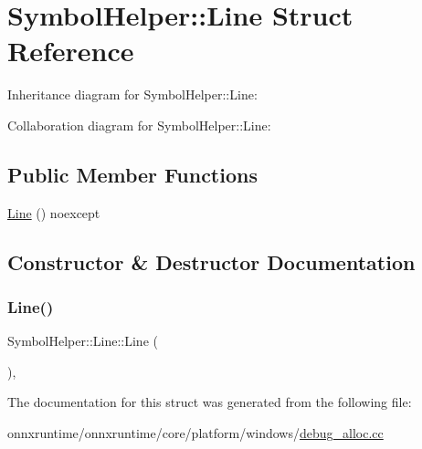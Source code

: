 \hypertarget{structSymbolHelper_1_1Line}{}\section{Symbol\+Helper\+:\+:Line Struct Reference}
\label{structSymbolHelper_1_1Line}


Inheritance diagram for Symbol\+Helper\+:\+:Line\+:


Collaboration diagram for Symbol\+Helper\+:\+:Line\+:
\subsection*{Public Member Functions}
\begin{DoxyCompactItemize}
\item 
\mbox{\hyperlink{structSymbolHelper_1_1Line_a3c312d9ad81dbf0a5128c0b874cde14a}{Line}} () noexcept
\end{DoxyCompactItemize}


\subsection{Constructor \& Destructor Documentation}
\mbox{\label{structSymbolHelper_1_1Line_a3c312d9ad81dbf0a5128c0b874cde14a}} 
\subsubsection{\texorpdfstring{Line()}{Line()}}
{\footnotesize\ttfamily Symbol\+Helper\+::\+Line\+::\+Line (\begin{DoxyParamCaption}{ }\end{DoxyParamCaption})\hspace{0.3cm}{\ttfamily [inline]}, {\ttfamily [noexcept]}}



The documentation for this struct was generated from the following file\+:\begin{DoxyCompactItemize}
\item 
onnxruntime/onnxruntime/core/platform/windows/\mbox{\hyperlink{debug__alloc_8cc}{debug\+\_\+alloc.\+cc}}\end{DoxyCompactItemize}
